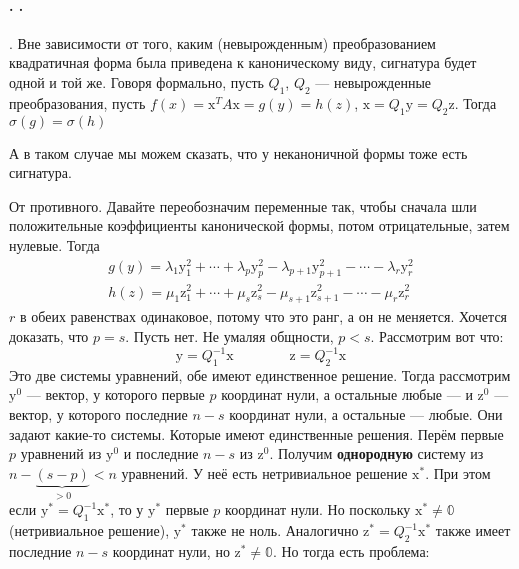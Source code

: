 \documentclass{article}
\begin{document}
    \paragraph{. .}
    \begin{itemize}
        \thm {}. Вне зависимости от того, каким (невырожденным) преобразованием квадратичная форма была приведена к каноническому виду, сигнатура будет одной и той же. Говоря формально, пусть $Q_1$, $Q_2$ --- невырожденные преобразования, пусть $f(x)=\mathrm x^TA\mathrm x=g(y)=h(z)$, $\mathrm x=Q_1\mathrm y=Q_2\mathrm z$. Тогда $\sigma(g)=\sigma(h)$
        \begin{Comment}
            А в таком случае мы можем сказать, что у неканоничной формы тоже есть сигнатура.
        \end{Comment}
        \begin{Proof}
            От противного. Давайте переобозначим переменные так, чтобы сначала шли положительные коэффициенты канонической формы, потом отрицательные, затем нулевые. Тогда
            \[
            \begin{split}
                g(y)=\lambda_1\mathrm y_1^2+\cdots+\lambda_p\mathrm y_p^2-\lambda_{p+1}\mathrm y_{p+1}^2-\cdots-\lambda_r\mathrm y_r^2\\
                h(z)=\mu_1\mathrm z_1^2+\cdots+\mu_s\mathrm z_s^2-\mu_{s+1}\mathrm z_{s+1}^2-\cdots-\mu_r\mathrm z_r^2
            \end{split}
            \]
            $r$ в обеих равенствах одинаковое, потому что это ранг, а он не меняется. Хочется доказать, что $p=s$. Пусть нет. Не умаляя общности, $p<s$. Рассмотрим вот что:
            $$
            \mathrm y=Q_1^{-1}\mathrm x\qquad\qquad\mathrm z=Q_2^{-1}\mathrm x
            $$
            Это две системы уравнений, обе имеют единственное решение. Тогда рассмотрим $\mathrm y^0$ --- вектор, у которого первые $p$ координат нули, а остальные любые --- и $\mathrm z^0$ --- вектор, у которого последние $n-s$ координат нули, а остальные --- любые. Они задают какие-то системы. Которые имеют единственные решения. Перём первые $p$ уравнений из $\mathrm y^0$ и последние $n-s$ из $\mathrm z^0$. Получим \textbf{однородную} систему из $n-\underbrace{(s-p)}_{>0}<n$ уравнений. У неё есть нетривиальное решение $\mathrm x^*$. При этом если $\mathrm y^*=Q_1^{-1}\mathrm x^*$, то у $\mathrm y^*$ первые $p$ координат нули. Но поскольку $\mathrm x^*\neq\mathbb0$ (нетривиальное решение), $\mathrm y^*$ также не ноль. Аналогично $\mathrm z^*=Q_2^{-1}\mathrm x^*$ также имеет последние $n-s$ координат нули, но $\mathrm z^*\neq\mathbb0$. Но тогда есть проблема:

\end{Proof}
\end{itemize}
\end{document}
